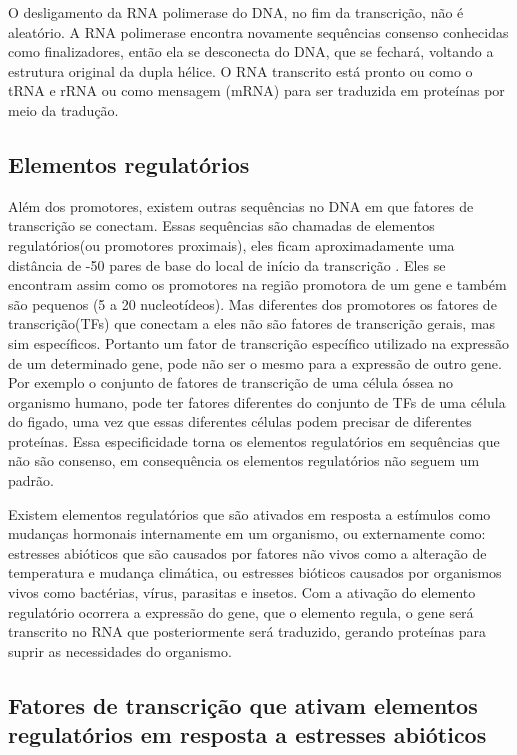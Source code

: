 O desligamento da RNA polimerase do DNA, no fim da transcrição, não é aleatório. A RNA polimerase encontra novamente sequências consenso conhecidas como finalizadores, então ela se desconecta do DNA, que se fechará, voltando a estrutura original da dupla hélice. O RNA transcrito está pronto ou como o tRNA e rRNA ou como mensagem (mRNA) para ser traduzida em proteínas por meio da tradução.

\subsection{Elementos regulatórios}

Além dos promotores, existem outras sequências no DNA em que fatores de transcrição se conectam. Essas sequências são chamadas de elementos regulatórios(ou promotores proximais), eles ficam aproximadamente uma distância de -50 pares de base do local de início da transcrição \cite{Zaha2000}. Eles se encontram assim como os promotores na região promotora de um gene e também são pequenos (5 a 20 nucleotídeos). Mas diferentes dos promotores os fatores de transcrição(TFs) que conectam a eles não são fatores de transcrição gerais, mas sim específicos. Portanto um fator de transcrição específico utilizado na expressão de um determinado gene, pode não ser o mesmo para a expressão de outro gene. Por exemplo o conjunto de fatores de transcrição de uma célula óssea no organismo humano, pode ter fatores diferentes do conjunto de TFs de uma célula do figado, uma vez que essas diferentes células podem precisar de diferentes proteínas. Essa especificidade torna os elementos regulatórios em sequências que não são consenso, em consequência os elementos regulatórios não seguem um padrão.

Existem elementos regulatórios que são ativados em resposta a estímulos como mudanças hormonais internamente em um organismo, ou externamente como: estresses abióticos que são causados por fatores não vivos como a alteração de temperatura e mudança climática, ou estresses bióticos causados por organismos vivos como bactérias, vírus, parasitas e insetos. Com a ativação do elemento regulatório ocorrera a expressão do gene, que o elemento regula, o gene será transcrito no RNA que posteriormente será traduzido, gerando proteínas para suprir as necessidades do organismo.

\subsection{Fatores de transcrição que ativam elementos regulatórios em resposta a estresses abióticos}

